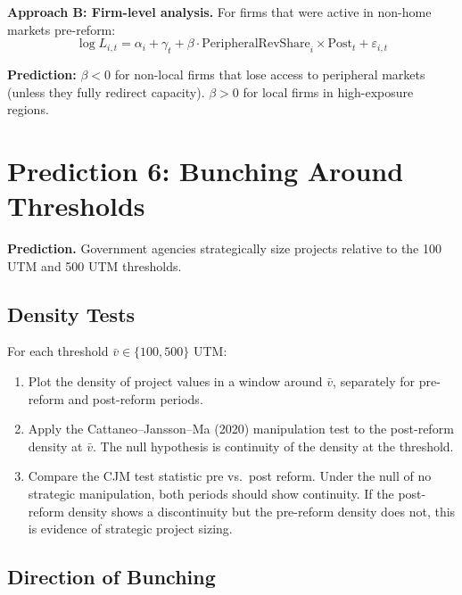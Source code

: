 \documentclass[12pt]{article}
\begin{document}
\medskip
\noindent \textbf{Approach B: Firm-level analysis.} For firms that were active in non-home markets pre-reform:
\begin{equation}\label{eq:firm_employment}
    \log L_{i,t} = \alpha_i + \gamma_t + \beta \cdot \text{PeripheralRevShare}_i \times \text{Post}_t + \varepsilon_{i,t}
\end{equation}

\textbf{Prediction:} $\beta < 0$ for non-local firms that lose access to peripheral markets (unless they fully redirect capacity). $\beta > 0$ for local firms in high-exposure regions.

\section{Prediction 6: Bunching Around Thresholds}

\textbf{Prediction.} Government agencies strategically size projects relative to the 100 UTM and 500 UTM thresholds.

\subsection{Density Tests}

For each threshold $\bar{v} \in \{100, 500\}$ UTM:

\begin{enumerate}[label=\textbf{Step \arabic*:}]
    \item Plot the density of project values in a window around $\bar{v}$, separately for pre-reform and post-reform periods.
    \item Apply the Cattaneo--Jansson--Ma (2020) manipulation test to the post-reform density at $\bar{v}$. The null hypothesis is continuity of the density at the threshold.
    \item Compare the CJM test statistic pre vs.\ post reform. Under the null of no strategic manipulation, both periods should show continuity. If the post-reform density shows a discontinuity but the pre-reform density does not, this is evidence of strategic project sizing.
\end{enumerate}

\subsection{Direction of Bunching}
\end{document}
